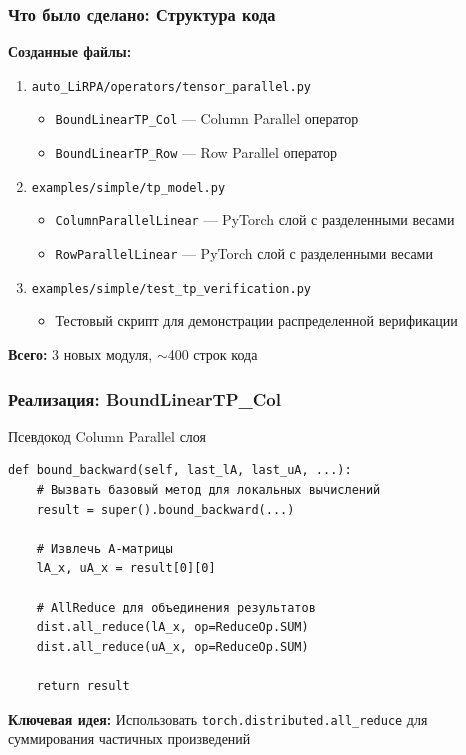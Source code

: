\begin{frame}[fragile]
\frametitle{Что было сделано: Структура кода}

\textbf{Созданные файлы:}

\begin{enumerate}
    \item \texttt{auto\_LiRPA/operators/tensor\_parallel.py}
    \begin{itemize}
        \item \texttt{BoundLinearTP\_Col} --- Column Parallel оператор
        \item \texttt{BoundLinearTP\_Row} --- Row Parallel оператор
    \end{itemize}

    \item \texttt{examples/simple/tp\_model.py}
    \begin{itemize}
        \item \texttt{ColumnParallelLinear} --- PyTorch слой с разделенными весами
        \item \texttt{RowParallelLinear} --- PyTorch слой с разделенными весами
    \end{itemize}

    \item \texttt{examples/simple/test\_tp\_verification.py}
    \begin{itemize}
        \item Тестовый скрипт для демонстрации распределенной верификации
    \end{itemize}
\end{enumerate}

\vspace{0.3cm}

\textbf{Всего:} 3 новых модуля, $\sim$400 строк кода

\end{frame}

\begin{frame}[fragile]
\frametitle{Реализация: BoundLinearTP\_Col}

\begin{block}{Псевдокод Column Parallel слоя}
\begin{verbatim}
def bound_backward(self, last_lA, last_uA, ...):
    # Вызвать базовый метод для локальных вычислений
    result = super().bound_backward(...)

    # Извлечь A-матрицы
    lA_x, uA_x = result[0][0]

    # AllReduce для объединения результатов
    dist.all_reduce(lA_x, op=ReduceOp.SUM)
    dist.all_reduce(uA_x, op=ReduceOp.SUM)

    return result
\end{verbatim}
\end{block}

\textbf{Ключевая идея:} Использовать \texttt{torch.distributed.all\_reduce} для суммирования частичных произведений

\end{frame}

